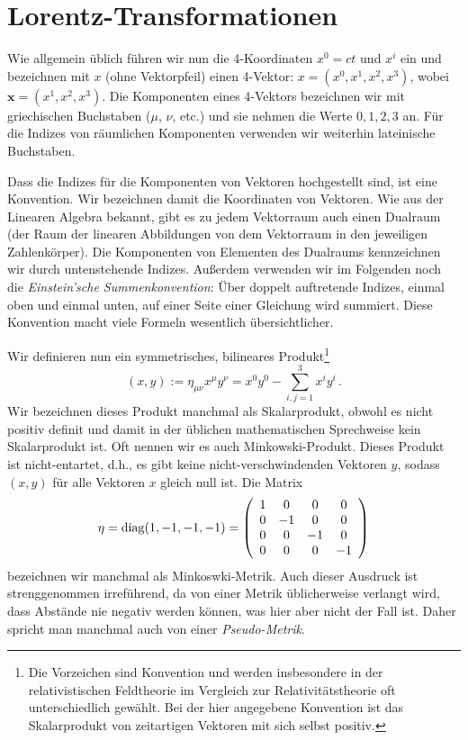 \section{Lorentz-Transformationen}
\label{sec_Lorentz}

Wie allgemein \"ublich f\"uhren wir nun 
die 4-Koordinaten $x^0=ct$ und $x^i$
ein und bezeichnen mit $x$ (ohne Vektorpfeil)
einen 4-Vektor: $x=(x^0,x^1,x^2,x^3)$, wobei
$\pmb{x}=(x^1,x^2,x^3)$.
Die Komponenten eines 4-Vektors
bezeichnen wir mit griechischen
Buchstaben ($\mu$, $\nu$, etc.) und sie
nehmen die Werte $0,1,2,3$ an. F\"ur die Indizes von
r\"aumlichen Komponenten verwenden wir
weiterhin lateinische Buchstaben. 

Dass die Indizes f\"ur die Komponenten
von Vektoren hochgestellt sind, ist eine
Konvention. Wir bezeichnen damit die
Koordinaten von Vektoren. Wie aus der
Linearen Algebra bekannt, gibt es zu
jedem Vektorraum auch einen
Dualraum (der Raum der linearen 
Abbildungen von dem Vektorraum in
den jeweiligen Zahlenk\"orper). Die
Komponenten von Elementen des
Dualraums kennzeichnen wir durch
untenstehende Indizes. Au\ss erdem
verwenden wir im Folgenden noch
die {\em Einstein'sche Summenkonvention}:
\"Uber doppelt auftretende Indizes,
einmal oben und einmal unten, auf einer
Seite einer Gleichung wird summiert.
Diese Konvention macht viele
Formeln wesentlich \"ubersichtlicher.

Wir definieren nun ein symmetrisches,
bilineares Produkt\footnote{Die Vorzeichen sind Konvention und werden
insbesondere in der relativistischen Feldtheorie im Vergleich zur Relativit\"atstheorie
oft unterschiedlich gew\"ahlt. Bei der hier angegebene Konvention ist das Skalarprodukt
von zeitartigen Vektoren mit sich selbst positiv.}
\begin{equation}
      (x,y) :=  \eta_{\mu \nu} x^\mu y^\nu
      = x^0 y^0 - \sum_{i,j=1}^3 x^i y^i  \, .
\end{equation}
Wir bezeichnen dieses Produkt manchmal
als Skalarprodukt, obwohl es nicht
positiv definit und damit in der \"ublichen 
mathematischen Sprechweise
kein Skalarprodukt ist. Oft nennen wir es auch
Minkowski-Produkt. Dieses Produkt ist 
nicht-entartet, d.h., es gibt keine nicht-verschwindenden
Vektoren $y$, sodass $(x,y)$ f\"ur alle Vektoren
$x$ gleich null ist. Die Matrix
\begin{equation}
       \eta = {\rm diag}(1,-1,-1,-1) =
       \left( \begin{array}{cccc}
       1 & 0 & 0 &  0 \\
       0 & -1 & 0 &  0 \\
       0 & 0 & -1 &  0 \\
       0 & 0 & 0 &  -1  \end{array} \right) 
\end{equation}
bezeichnen wir manchmal als
Minkoswki-Metrik. Auch dieser Ausdruck
ist strenggenommen irref\"uhrend, da
von einer Metrik \"ublicherweise verlangt wird,
dass Abst\"ande nie negativ werden
k\"onnen, was hier aber nicht der Fall ist.
Daher spricht man manchmal auch von
einer {\em Pseudo-Metrik}. 

